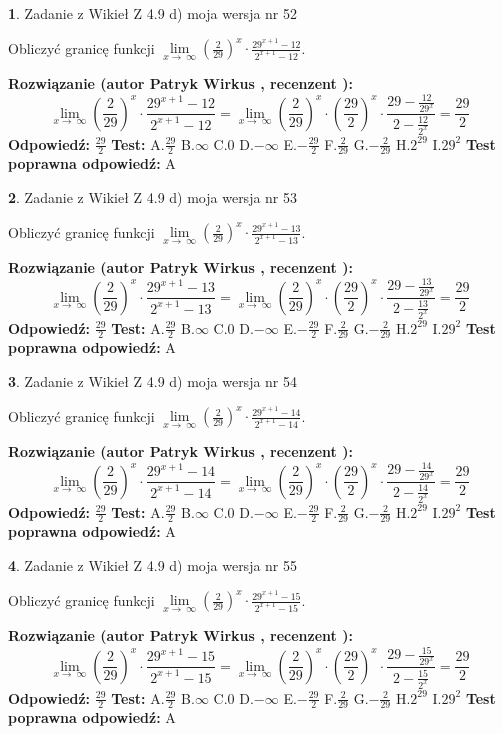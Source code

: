 \documentclass[12pt, a4paper]{article}
\theoremstyle{definition} %
\newtheorem{zad}{}
\newcommand{\zadStart}[1]{\begin{zad}#1\newline}
\newcommand{\zadStop}{\end{zad}}
\newcommand{\rozwStart}[2]{\noindent \textbf{Rozwiązanie (autor #1 , recenzent #2): }\newline}
\newcommand{\rozwStop}{\newline}
\newcommand{\odpStart}{\noindent \textbf{Odpowiedź:}\newline}
\newcommand{\odpStop}{\newline}
\newcommand{\testStart}{\noindent \textbf{Test:}\newline}
\newcommand{\testStop}{\newline}
\newcommand{\kluczStart}{\noindent \textbf{Test poprawna odpowiedź:}\newline}
\newcommand{\kluczStop}{\newline}
\begin{document}
\zadStart{Zadanie z Wikieł Z 4.9 d) moja wersja nr 52}


Obliczyć granicę funkcji  $\lim\limits_{x\to\ \infty}(\frac{2}{29})^{x}\cdot\frac{29^{x+1}-12}{2^{x+1}-12}$.
\zadStop
\rozwStart{Patryk Wirkus}{}
$$\lim\limits_{x\to\ \infty}(\frac{2}{29})^{x}\cdot\frac{29^{x+1}-12}{2^{x+1}-12}=\lim\limits_{x\to\ \infty}(\frac{2}{29})^{x}\cdot(\frac{29}{2})^{x} \cdot \frac{29-\frac{12}{29^{x}}}{2-\frac{12}{2^{x}}} = \frac{29}{2}$$
\rozwStop
\odpStart
$\frac{29}{2}$
\odpStop
\testStart
A.$\frac{29}{2}$ B.$\infty$ C.$0$ D.$-\infty$ E.$-\frac{29}{2}$
F.$\frac{2}{29}$ G.$-\frac{2}{29}$
H.$2^{29}$
I.$29^{2}$
\testStop
\kluczStart
A
\kluczStop



\zadStart{Zadanie z Wikieł Z 4.9 d) moja wersja nr 53}


Obliczyć granicę funkcji  $\lim\limits_{x\to\ \infty}(\frac{2}{29})^{x}\cdot\frac{29^{x+1}-13}{2^{x+1}-13}$.
\zadStop
\rozwStart{Patryk Wirkus}{}
$$\lim\limits_{x\to\ \infty}(\frac{2}{29})^{x}\cdot\frac{29^{x+1}-13}{2^{x+1}-13}=\lim\limits_{x\to\ \infty}(\frac{2}{29})^{x}\cdot(\frac{29}{2})^{x} \cdot \frac{29-\frac{13}{29^{x}}}{2-\frac{13}{2^{x}}} = \frac{29}{2}$$
\rozwStop
\odpStart
$\frac{29}{2}$
\odpStop
\testStart
A.$\frac{29}{2}$ B.$\infty$ C.$0$ D.$-\infty$ E.$-\frac{29}{2}$
F.$\frac{2}{29}$ G.$-\frac{2}{29}$
H.$2^{29}$
I.$29^{2}$
\testStop
\kluczStart
A
\kluczStop



\zadStart{Zadanie z Wikieł Z 4.9 d) moja wersja nr 54}


Obliczyć granicę funkcji  $\lim\limits_{x\to\ \infty}(\frac{2}{29})^{x}\cdot\frac{29^{x+1}-14}{2^{x+1}-14}$.
\zadStop
\rozwStart{Patryk Wirkus}{}
$$\lim\limits_{x\to\ \infty}(\frac{2}{29})^{x}\cdot\frac{29^{x+1}-14}{2^{x+1}-14}=\lim\limits_{x\to\ \infty}(\frac{2}{29})^{x}\cdot(\frac{29}{2})^{x} \cdot \frac{29-\frac{14}{29^{x}}}{2-\frac{14}{2^{x}}} = \frac{29}{2}$$
\rozwStop
\odpStart
$\frac{29}{2}$
\odpStop
\testStart
A.$\frac{29}{2}$ B.$\infty$ C.$0$ D.$-\infty$ E.$-\frac{29}{2}$
F.$\frac{2}{29}$ G.$-\frac{2}{29}$
H.$2^{29}$
I.$29^{2}$
\testStop
\kluczStart
A
\kluczStop



\zadStart{Zadanie z Wikieł Z 4.9 d) moja wersja nr 55}


Obliczyć granicę funkcji  $\lim\limits_{x\to\ \infty}(\frac{2}{29})^{x}\cdot\frac{29^{x+1}-15}{2^{x+1}-15}$.
\zadStop
\rozwStart{Patryk Wirkus}{}
$$\lim\limits_{x\to\ \infty}(\frac{2}{29})^{x}\cdot\frac{29^{x+1}-15}{2^{x+1}-15}=\lim\limits_{x\to\ \infty}(\frac{2}{29})^{x}\cdot(\frac{29}{2})^{x} \cdot \frac{29-\frac{15}{29^{x}}}{2-\frac{15}{2^{x}}} = \frac{29}{2}$$
\rozwStop
\odpStart
$\frac{29}{2}$
\odpStop
\testStart
A.$\frac{29}{2}$ B.$\infty$ C.$0$ D.$-\infty$ E.$-\frac{29}{2}$
F.$\frac{2}{29}$ G.$-\frac{2}{29}$
H.$2^{29}$
I.$29^{2}$
\testStop
\kluczStart
A
\kluczStop
\end{document}
